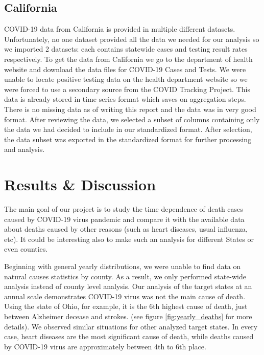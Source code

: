 \documentclass[conference]{IEEEtran}
\begin{document}
\subsection{California}


COVID-19 data from California is provided in multiple different datasets.
Unfortunately, no one dataset provided all the data we needed for our analysis so we imported 2 datasets: each contains statewide cases and testing result rates respectively.
To get the data from California we go to the department of health website and download the data files for COVID-19 Cases and Tests.
We were unable to locate positive testing data on the health department website so we were forced to use a secondary source from the COVID Tracking Project.
This data is already stored in time series format which saves on aggregation steps.
There is no missing data as of writing this report and the data was in very good format. After reviewing the data, we selected a subset of columns containing only the data we had decided to include in our standardized format. After selection, the data subset was exported in the standardized format for further processing and analysis.

\section{ Results \& Discussion }

The main goal of our project is to study the time dependence of death cases caused by COVID-19 virus pandemic and compare it with the available data about deaths caused by other reasons (such as heart diseases, usual influenza, etc). It could be interesting also to make such an analysis for different States or even counties.

Beginning with general yearly distributions, we were unable to find data on natural causes statistics by county. As a result, we only performed state-wide analysis instead of county level analysis. Our analysis of the target states at an annual scale demonstrates COVID-19 virus was not the main cause of death. Using the state of Ohio, for example, it is the 6th highest cause of death, just between Alzheimer decease and strokes. (see figure \ref{fig:yearly_deaths} for more details). We observed similar situations for other analyzed target states. In every case, heart diseases are the most significant cause of death, while deaths caused by COVID-19 virus are approximately between 4th to 6th place.
\end{document}
